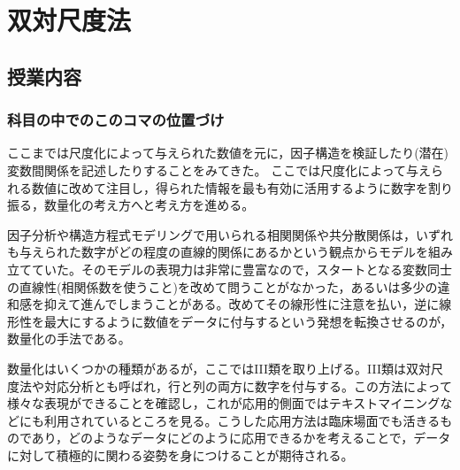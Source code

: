 \section{双対尺度法}
\subsection{授業内容}
\subsubsection{科目の中でのこのコマの位置づけ}
ここまでは尺度化によって与えられた数値を元に，因子構造を検証したり(潜在)変数間関係を記述したりすることをみてきた。
ここでは尺度化によって与えられる数値に改めて注目し，得られた情報を最も有効に活用するように数字を割り振る，数量化の考え方へと考え方を進める。

因子分析や構造方程式モデリングで用いられる相関関係や共分散関係は，いずれも与えられた数字がどの程度の直線的関係にあるかという観点からモデルを組み立てていた。そのモデルの表現力は非常に豊富なので，スタートとなる変数同士の直線性(相関係数を使うこと)を改めて問うことがなかった，あるいは多少の違和感を抑えて進んでしまうことがある。改めてその線形性に注意を払い，逆に線形性を最大にするように数値をデータに付与するという発想を転換させるのが，数量化の手法である。

数量化はいくつかの種類があるが，ここではIII類を取り上げる。III類は双対尺度法や対応分析とも呼ばれ，行と列の両方に数字を付与する。この方法によって様々な表現ができることを確認し，これが応用的側面ではテキストマイニングなどにも利用されているところを見る。こうした応用方法は臨床場面でも活きるものであり，どのようなデータにどのように応用できるかを考えることで，データに対して積極的に関わる姿勢を身につけることが期待される。

